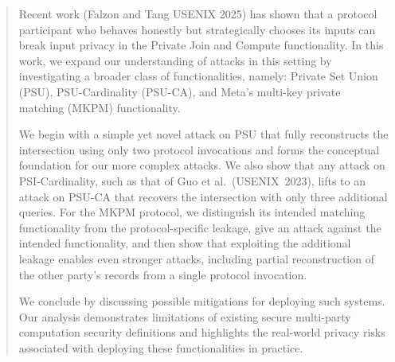 \begin{abstract}
Recent work (Falzon and Tang USENIX 2025) has shown that a protocol participant who behaves honestly but strategically chooses its inputs can break input privacy in the Private Join and Compute functionality.
In this work, we expand our understanding of attacks in this setting by investigating a broader class of functionalities, namely: Private Set Union (PSU), PSU-Cardinality (PSU-CA), and Meta's multi-key private matching (MKPM) functionality.

We begin with a simple yet novel attack on PSU that fully reconstructs the intersection using only two protocol invocations and forms the conceptual foundation for our more complex attacks. We also show that any attack on PSI-Cardinality, such as that of Guo et al.\ (USENIX~2023), lifts to an attack on PSU-CA that recovers the intersection with only three additional queries. For the MKPM protocol, we distinguish its intended matching functionality from the protocol-specific leakage, give an attack against the intended functionality, and then show that exploiting the additional leakage enables even stronger attacks, including partial reconstruction of the other party’s records from a single protocol invocation.

We conclude by discussing possible mitigations for deploying such systems. Our analysis demonstrates limitations of existing secure multi-party computation security definitions and highlights the real-world privacy risks associated with deploying these functionalities in practice.
\end{abstract}
